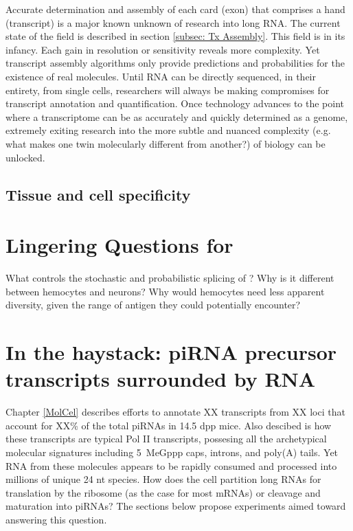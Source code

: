     Accurate determination and assembly of each card (exon) that comprises a hand (transcript) is a major known unknown of research into long RNA. The current state of the field is described in section \ref{subsec: Tx Assembly}. This field is in its infancy. Each gain in resolution or sensitivity reveals more complexity. Yet transcript assembly algorithms only provide predictions and probabilities for the existence of real molecules. Until RNA can be directly sequenced, in their entirety, from single cells, researchers will always be making compromises for transcript annotation and quantification. Once technology advances to the point where a transcriptome can be as accurately and quickly determined as a genome, extremely exiting research into the more subtle and nuanced complexity (e.g. what makes one twin molecularly different from another?) of biology can be unlocked.


  \subsection{Tissue and cell specificity}


\section{Lingering Questions for \dscam{}}

  What controls the stochastic and probabilistic splicing of \dscam{}? Why is it different between hemocytes and neurons? Why would hemocytes need less apparent diversity, given the range of antigen they could potentially encounter?

\section{In the haystack: piRNA precursor transcripts surrounded by RNA}


  Chapter \ref{MolCel} describes efforts to annotate XX transcripts from XX loci that account for XX\% of the total piRNAs in 14.5 dpp mice. 
  Also descibed is how these transcripts are typical Pol II transcripts, possesing all the archetypical molecular signatures including 5\textprime~MeGppp caps, introns, and poly(A) tails. Yet RNA from these molecules appears to be rapidly consumed and processed into millions of unique 24 nt species. How does the cell partition long RNAs for translation by the ribosome (as the case for most mRNAs) or cleavage and maturation into piRNAs? The sections below propose experiments aimed toward answering this question.


